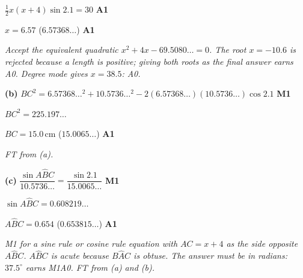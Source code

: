 \documentclass[12pt, twoside]{article}
\begin{document}
\begin{enumerate}[itemsep=0.3cm]
$\frac{1}{2}x(x + 4)\sin 2.1 = 30$ \hfill \textbf{A1}

$x = 6.57$ \quad ($6.57368\ldots$) \hfill \textbf{A1}

\emph{Accept the equivalent quadratic $x^{2} + 4x - 69.5080\ldots = 0$.
The root $x = -10.6$ is rejected because a length is positive; giving both
roots as the final answer earns A0. Degree mode gives $x = 38.5$: A0.}

\textbf{(b)} $BC^{2} = 6.57368\ldots^{2} + 10.5736\ldots^{2} - 2(6.57368\ldots)(10.5736\ldots)\cos 2.1$ \hfill \textbf{M1}

$BC^{2} = 225.197\ldots$

$BC = 15.0\,\text{cm}$ \quad ($15.0065\ldots$) \hfill \textbf{A1}

\emph{FT from (a).}

\textbf{(c)} $\dfrac{\sin A\hat{B}C}{10.5736\ldots} = \dfrac{\sin 2.1}{15.0065\ldots}$ \hfill \textbf{M1}

$\sin A\hat{B}C = 0.608219\ldots$

$A\hat{B}C = 0.654$ \quad ($0.653815\ldots$) \hfill \textbf{A1}

\emph{M1 for a sine rule or cosine rule equation with $AC = x + 4$ as the
side opposite $A\hat{B}C$. $A\hat{B}C$ is acute because $B\hat{A}C$ is
obtuse. The answer must be in radians: $37.5^\circ$ earns M1A0. FT from
(a) and (b).}

\end{enumerate}
\end{document}

